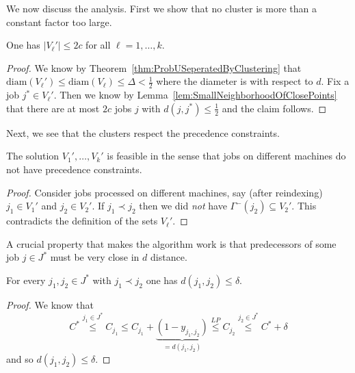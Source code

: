 We now discuss the analysis. First we show that no cluster is more than a constant factor too large.
\begin{lemma}
One has $|V_{\ell}'| \leq 2c$ for all $\ell=1,\ldots,k$.
\end{lemma}
\begin{proof}
  We know by Theorem~\ref{thm:ProbUSeperatedByClustering} that $\textrm{diam}(V_{\ell}') \leq \textrm{diam}(V_{\ell}) \leq \Delta < \frac{1}{2}$ 
  where the diameter is with respect to $d$.
  Fix a job $j^* \in V_{\ell}'$. 
  Then we know by Lemma~\ref{lem:SmallNeighborhoodOfClosePoints} that there are at most $2c$
  jobs $j$ with $d(j,j^*) \leq \frac{1}{2}$ and the claim follows.
\end{proof}

Next, we see that the clusters respect the precedence constraints.
\begin{lemma}
The solution $V_{1}',\ldots,V_{k}'$ is feasible in the sense that jobs on different machines do not have precedence constraints.
\end{lemma}
\begin{proof}
  Consider jobs processed on different machines, say (after reindexing) $j_1 \in V_{1}'$ and $j_2 \in V_2'$.
   If $j_1 \prec j_2$ then we did \emph{not} have $\Gamma^-(j_2) \subseteq V_2'$. This contradicts
  the definition of the sets $V_{\ell}'$.
\end{proof}


A crucial property that makes the algorithm work is that predecessors of some job $j \in J^*$ must be very close in $d$ distance.
\begin{lemma} \label{lem:DependentJobsInJStarAreCloseInMetricD}
For every $j_1,j_2 \in J^*$ with $j_1 \prec j_2$ one has $d(j_1,j_2) \leq \delta$.
\end{lemma}
\begin{proof}
  We know that
  \[
C^* \stackrel{j_1 \in J^*}{\leq} C_{j_1} \leq C_{j_1} + \underbrace{(1-y_{j_1,j_2})}_{=d(j_1,j_2)} \stackrel{LP}{\leq} C_{j_2} \stackrel{j_2 \in J^*}{\leq} C^* + \delta
  \]
  and so $d(j_1,j_2) \leq \delta$.
\end{proof}

